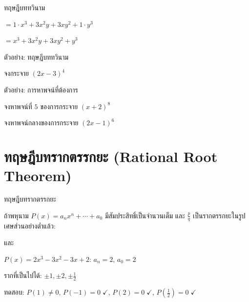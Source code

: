 \documentclass[11pt, aspectratio=169]{beamer}
\begin{document}
\begin{frame}{ทฤษฎีบททวินาม}
\begin{exambox}[ตัวอย่าง: $(x+y)^3$]
    $= 1 \cdot x^3 + 3x^2y + 3xy^2 + 1 \cdot y^3$

    $= x^3 + 3x^2y + 3xy^2 + y^3$
  \end{exambox}
\end{frame}\begin{frame}[t]{ตัวอย่าง: ทฤษฎีบททวินาม}
  \begin{exambox}[โจทย์ 1]
    จงกระจาย $(2x - 3)^4$
  \end{exambox}
  \vspace{\fill}


\end{frame}

\begin{frame}[t]{ตัวอย่าง: การหาพจน์ที่ต้องการ}
  \begin{exambox}[โจทย์]
    จงหาพจน์ที่ $5$ ของการกระจาย $(x + 2)^{8}$
  \end{exambox}
  \vspace{\fill}


  \begin{exambox}[โจทย์ 2]
    จงหาพจน์กลางของการกระจาย $(2x - 1)^6$
  \end{exambox}
  \vspace{\fill}
\end{frame}

\section{ทฤษฎีบทรากตรรกยะ (Rational Root Theorem)}

\begin{frame}{ทฤษฎีบทรากตรรกยะ}
  \begin{explanation}[ทฤษฎีบท]
    ถ้าพหุนาม $P(x) = a_nx^n + \cdots + a_0$ มีสัมประสิทธิ์เป็นจำนวนเต็ม
    และ $\frac{p}{q}$ เป็นรากตรรกยะในรูปเศษส่วนอย่างตํ่าแล้ว:

     \quad และ \quad {}
  \end{explanation}

  \begin{exambox}
    $P(x) = 2x^3 - 3x^2 - 3x + 2$: \quad $a_n = 2$, $a_0 = 2$

    รากที่เป็นไปได้: $\pm 1, \pm 2, \pm \frac{1}{2}$

    ทดสอบ: $P(1) \neq 0$, \quad $P(-1) = 0 \;\checkmark$, \quad $P(2) = 0 \;\checkmark$,
    \quad $P(\frac{1}{2}) = 0 \;\checkmark$

  \end{exambox}
\end{frame}
\end{document}
